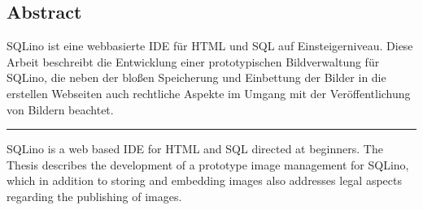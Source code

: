 \begin{titlepage}

\section*{Abstract}

SQLino ist eine webbasierte IDE für HTML und SQL auf Einsteigerniveau. Diese
Arbeit beschreibt die Entwicklung einer prototypischen Bildverwaltung für
SQLino, die neben der bloßen Speicherung und Einbettung der Bilder in die
erstellen Webseiten auch rechtliche Aspekte im Umgang mit der Veröffentlichung
von Bildern beachtet.

\rule{\textwidth}{1pt}

SQLino is a web based IDE for HTML and SQL directed at beginners. The Thesis
describes the development of a prototype image management for SQLino, which in
addition to storing and embedding images also addresses legal aspects regarding
the publishing of images.

\end{titlepage}

